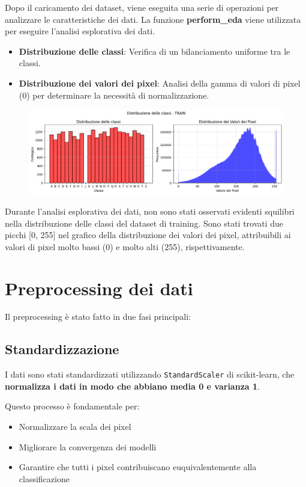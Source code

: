 \documentclass{article}
\begin{document}
Dopo il caricamento dei dataset, viene eseguita una serie di operazioni per analizzare le caratteristiche dei dati. 
La funzione \textbf{perform\_eda} viene utilizzata per eseguire l'analisi esplorativa dei dati.

\begin{itemize} 
    \item \textbf{Distribuzione delle classi}: Verifica di un bilanciamento uniforme tra le classi. 
    \item \textbf{Distribuzione dei valori dei pixel}: Analisi della gamma di valori di pixel (0) per 
    determinare la necessità di normalizzazione. 
\end{itemize}

\begin{figure}[H]
    \centering
    \includegraphics[scale=0.5]{Figures/output2.png}\label{fig:dataset_EDA}
\end{figure}

Durante l'analisi esplorativa dei dati, non sono stati osservati evidenti squilibri nella distribuzione delle classi 
del dataset di training. Sono stati trovati due picchi [0, 255] nel grafico della distribuzione dei valori dei pixel,
attribuibili ai valori di pixel molto bassi (0) e molto alti (255), rispettivamente. 

\section{Preprocessing dei dati}

Il preprocessing è stato fatto in due fasi principali:

\subsection{Standardizzazione}
I dati sono stati standardizzati utilizzando \texttt{StandardScaler} di scikit-learn, che 
\textbf{normalizza i dati in modo che abbiano media 0 e varianza 1}.

Questo processo è fondamentale per: 
\begin{itemize}
    \item Normalizzare la scala dei pixel 
    \item Migliorare la convergenza dei modelli
    \item Garantire che tutti i pixel contribuiscano euquivalentemente alla classificazione
\end{itemize}
\end{document}
